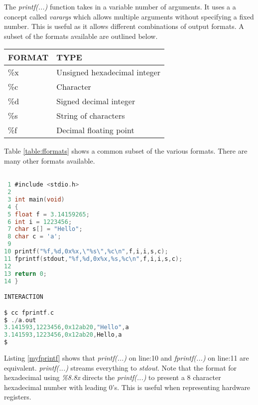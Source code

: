 
The \textit{printf(...)} function takes in a variable number of arguments. It uses a a concept called \textit{varargs} which allows multiple arguments without specifying a fixed number. This is useful as it allows different combinations of output formats. A subset of the formats available are outlined below.\newpage

\begin{table*}[ht]
\centering
  \begin{tabular}{ | l | l |}
    \hline
    FORMAT & TYPE \\ \hline
    \%x & Unsigned hexadecimal integer \\ \hline
    \%c & Character \\ \hline
    \%d & Signed decimal integer \\ \hline
    \%s & String of characters \\ \hline
    \%f & Decimal floating point \\ \hline
  \end{tabular}
\caption{Field formats}
\label{table:fformats}
\end{table*}

Table \ref{table:fformats} shows a common subset of the various formats. There are many other formats available. 

\begin{lstlisting}[language=C,showstringspaces=false,caption={File: fprintf.c},captionpos=b,label=myfprintf]

 1 #include <stdio.h>
 2 
 3 int main(void)
 4 {
 5 float f = 3.14159265;
 6 int i = 1223456;
 7 char s[] = "Hello";
 8 char c = 'a';
 9 
10 printf("%f,%d,0x%x,\"%s\",%c\n",f,i,i,s,c);
11 fprintf(stdout,"%f,%d,0x%x,%s,%c\n",f,i,i,s,c);
12 
13 return 0;
14 }  

INTERACTION

$ cc fprintf.c
$ ./a.out
3.141593,1223456,0x12ab20,"Hello",a
3.141593,1223456,0x12ab20,Hello,a
$ 

\end{lstlisting}

Listing \ref{myfprintf} shows that \textit{printf(...)} on line:10 and \textit{fprintf(...)} on line:11 are equivalent. \textit{printf(...)} streams everything to \textit{stdout}. Note that the format for hexadecimal using \textit{\%8.8x} directs the \textit{printf(...)} to present a 8 character hexadecimal number with leading 0's. This is useful when representing hardware registers.   

